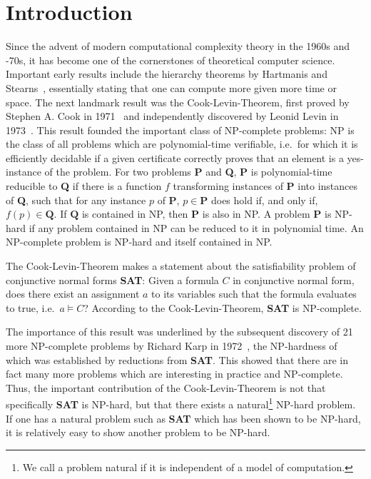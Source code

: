 \chapter{Introduction}\label{chap:introduction}
\newcommand{\SAT}{\textbf{SAT}}
\newcommand{\Clique}{\textbf{Clique}}
\newcommand{\NP}{\textsf{NP}}
\newcommand{\PC}{\textsf{P}}

\newcommand{\PR}{\textbf{PR}}

Since the advent of modern computational complexity theory in the 1960s and -70s, it has become one of the cornerstones of theoretical computer science. 
Important early results include the hierarchy theorems by Hartmanis and Stearns~\cite{hartmanis_stearns}, essentially stating that one can compute more given more time or space. 
The next landmark result was the Cook-Levin-Theorem, first proved by Stephen A. Cook in 1971~\cite{cook_theorem} and independently discovered by Leonid Levin in 1973~\cite{levin_theorem}. 
This result founded the important class of \NP{}-complete problems: \NP{} is the class of all problems which are polynomial-time verifiable, i.e.\ for which it is efficiently decidable if a given certificate correctly proves that an element is a yes-instance of the problem. For two problems \textbf{P} and \textbf{Q}, \textbf{P} is polynomial-time reducible to \textbf{Q} if there is a function $f$ transforming instances of \textbf{P} into instances of \textbf{Q}, such that for any instance $p$ of \textbf{P}, $p \in \textbf{P}$ does hold if, and only if, $f(p) \in \textbf{Q}$. 
If $\textbf{Q}$ is contained in \NP{}, then $\textbf{P}$ is also in \NP{}.
A problem \textbf{P} is \NP{}-hard if any problem contained in \NP{} can be reduced to it in polynomial time. An \NP{}-complete problem is \NP{}-hard and itself contained in \NP{}.  

The Cook-Levin-Theorem makes a statement about the satisfiability problem of conjunctive normal forms \SAT{}: 
Given a formula $C$ in conjunctive normal form, does there exist an assignment $a$ to its variables such that the formula evaluates to \textsf{true}, i.e.\ $a \models C$?
According to the Cook-Levin-Theorem, \SAT{} is \NP{}-complete. 

The importance of this result was underlined by the subsequent discovery of 21 more \NP{}-complete problems by Richard Karp in 1972~\cite{Karp1972}, the \NP{}-hardness of which was established by reductions from \textbf{SAT}. This showed that there are in fact many more problems which are interesting in practice and \NP{}-complete. 
Thus, the important contribution of the Cook-Levin-Theorem is not that specifically \SAT{} is \NP{}-hard, but that there exists a natural\footnote{We call a problem natural if it is independent of a model of computation.} \NP{}-hard problem. If one has a natural problem such as \SAT{} which has been shown to be \NP{}-hard, it is relatively easy to show another problem to be \NP{}-hard.

